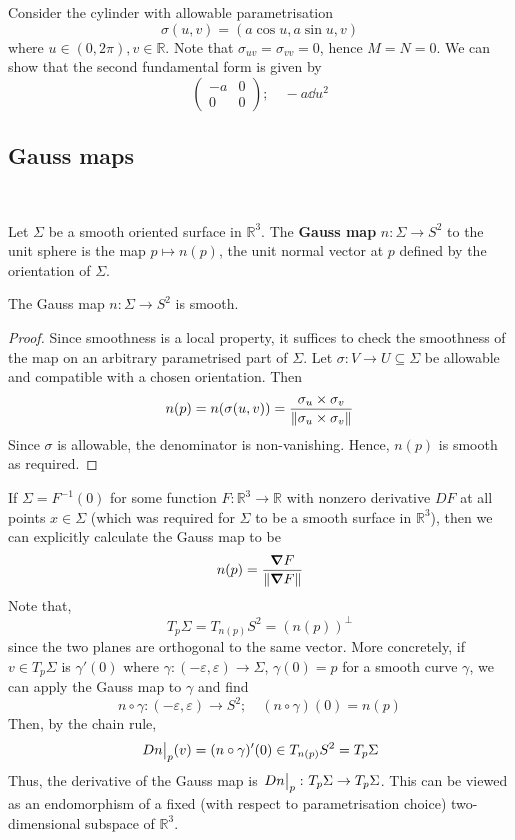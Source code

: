 \documentclass[a4paper,11pt]{article}
\begin{document}
\begin{example}
	Consider the cylinder with allowable parametrisation
	\[
		\sigma(u,v) = (a \cos u, a \sin u, v)
	\]
	where \( u \in (0,2\pi), v \in \mathbb R \).
	Note that \( \sigma_{uv} = \sigma_{vv} = 0 \), hence \( M = N = 0 \).
	We can show that the second fundamental form is given by
	\[
		\begin{pmatrix}
			-a & 0 \\
			0  & 0
		\end{pmatrix};\quad -a \dd{u}^2
	\]
\end{example}

\subsection{Gauss maps}
\ \vspace*{-1.5em}
\begin{definition}
	Let \( \Sigma \) be a smooth oriented surface in \( \mathbb R^3 \).
	The \textbf{Gauss map} \( n \colon \Sigma \to S^2 \) to the unit sphere is the map \( p \mapsto n(p) \), the unit normal vector at $p$ defined by the orientation of $\Sigma$. 
\end{definition}
\begin{lemma}
	The Gauss map $ n: \Sigma\to S^2 $ is smooth.
\end{lemma}
\begin{proof}
	Since smoothness is a local property, it suffices to check the smoothness of the map on an arbitrary parametrised part of \( \Sigma \).
	Let \( \sigma \colon V \to U \subseteq \Sigma \) be allowable and compatible with a chosen orientation.
	Then
	\[
		n(p) = n(\sigma(u,v))= \frac{\sigma_u \times \sigma_v}{\norm{\sigma_u \times \sigma_v}}
	\]
	Since \( \sigma \) is allowable, the denominator is non-vanishing.
	Hence, \( n(p) \) is smooth as required.
\end{proof}

If \( \Sigma = F^{-1}(0) \) for some function \( F \colon \mathbb R^3 \to \mathbb R \) with nonzero derivative \( DF \) at all points \( x \in \Sigma \) (which was required for \( \Sigma \) to be a smooth surface in \( \mathbb R^3 \)), then we can explicitly calculate the Gauss map to be
\[
	n(p) = \frac{\grad F}{\norm{\grad F}}
\]
Note that,
\[
	T_p \Sigma = T_{n(p)} S^2 = (n(p))^\perp
\]
since the two planes are orthogonal to the same vector.
More concretely, if \( v \in T_p \Sigma \) is \( \gamma'(0) \) where \( \gamma \colon (-\varepsilon, \varepsilon) \to \Sigma \), \( \gamma(0) = p \) for a smooth curve \( \gamma \), we can apply the Gauss map to \( \gamma \) and find
\[
	n \circ \gamma \colon (-\varepsilon, \varepsilon) \to S^2;\quad (n \circ \gamma)(0) = n(p)
\]
Then, by the chain rule,
\[
	\teval{Dn}{p}(v) = (n \circ \gamma)'(0) \in T_{n(p)} S^2 = T_p \Sigma
\]
Thus, the derivative of the Gauss map is \( \eval{Dn}_p \colon T_p \Sigma \to T_p \Sigma \).
This can be viewed as an endomorphism of a fixed (with respect to parametrisation choice) two-dimensional subspace of \( \mathbb R^3 \).
\end{document}
